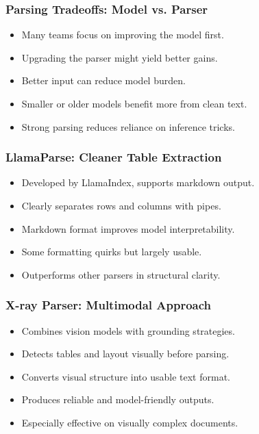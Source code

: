 \begin{frame}[fragile]\frametitle{Parsing Tradeoffs: Model vs. Parser}
  \begin{itemize}
    \item Many teams focus on improving the model first.
    \item Upgrading the parser might yield better gains.
    \item Better input can reduce model burden.
    \item Smaller or older models benefit more from clean text.
    \item Strong parsing reduces reliance on inference tricks.
  \end{itemize}
\end{frame}

\begin{frame}[fragile]\frametitle{LlamaParse: Cleaner Table Extraction}
  \begin{itemize}
    \item Developed by LlamaIndex, supports markdown output.
    \item Clearly separates rows and columns with pipes.
    \item Markdown format improves model interpretability.
    \item Some formatting quirks but largely usable.
    \item Outperforms other parsers in structural clarity.
  \end{itemize}
\end{frame}

\begin{frame}[fragile]\frametitle{X-ray Parser: Multimodal Approach}
  \begin{itemize}
    \item Combines vision models with grounding strategies.
    \item Detects tables and layout visually before parsing.
    \item Converts visual structure into usable text format.
    \item Produces reliable and model-friendly outputs.
    \item Especially effective on visually complex documents.
  \end{itemize}
\end{frame}

